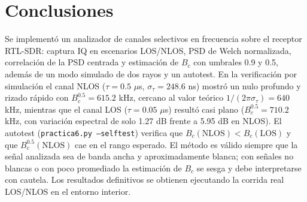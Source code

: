 \documentclass[11pt,a4paper]{article}
\begin{document}
\section{Conclusiones}

Se implementó un analizador de canales selectivos en frecuencia sobre el receptor RTL-SDR: captura IQ en escenarios LOS/NLOS, PSD de Welch normalizada, correlación de la PSD centrada y estimación de $B_c$ con umbrales 0.9 y 0.5, además de un modo simulado de dos rayos y un autotest. En la verificación por simulación el canal NLOS ($\tau=0.5$ $\mu$s, $\sigma_\tau=248.6$ ns) mostró un nulo profundo y rizado rápido con $B_c^{0.5}=615.2$ kHz, cercano al valor teórico $1/(2\pi\sigma_\tau)=640$ kHz, mientras que el canal LOS ($\tau=0.05$ $\mu$s) resultó casi plano ($B_c^{0.5}=710.2$ kHz, con variación espectral de solo 1.27 dB frente a 5.95 dB en NLOS). El autotest (\texttt{practica6.py --selftest}) verifica que $B_c(\text{NLOS})<B_c(\text{LOS})$ y que $B_c^{0.5}(\text{NLOS})$ cae en el rango esperado. El método es válido siempre que la señal analizada sea de banda ancha y aproximadamente blanca; con señales no blancas o con poco promediado la estimación de $B_c$ se sesga y debe interpretarse con cautela. Los resultados definitivos se obtienen ejecutando la corrida real LOS/NLOS en el entorno interior.
\end{document}
